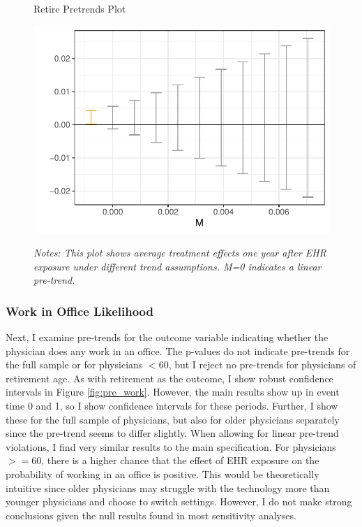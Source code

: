 \documentclass[12pt]{article}
\begin{document}
\begin{figure}[ht]
    \centering
    \captionsetup{width=.5\linewidth}
    \caption{Retire Pretrends Plot}
    \includegraphics[scale=.5]{Objects/retire_pretrends_plot.pdf}
    \label{fig:pre_retire}
    \vspace{2mm}
    \caption*{\footnotesize{\textit{Notes: This plot shows average treatment effects one year after EHR exposure under different trend assumptions. M=0 indicates a linear pre-trend.}}}
\end{figure}

\subsubsection{Work in Office Likelihood}

Next, I examine pre-trends for the outcome variable indicating whether the physician does any work in an office. The p-values do not indicate pre-trends for the full sample or for physicians $< 60$, but I reject no pre-trends for physicians of retirement age. As with retirement as the outcome, I show robust confidence intervals in Figure \ref{fig:pre_work}. However, the main results show up in event time 0 and 1, so I show confidence intervals for these periods. Further, I show these for the full sample of physicians, but also for older physicians separately since the pre-trend seems to differ slightly. When allowing for linear pre-trend violations, I find very similar results to the main specification. For physicians $>= 60$, there is a higher chance that the effect of EHR exposure on the probability of working in an office is positive. This would be theoretically intuitive since older physicians may struggle with the technology more than younger physicians and choose to switch settings. However, I do not make strong conclusions given the null results found in most sensitivity analyses. 
\end{document}
